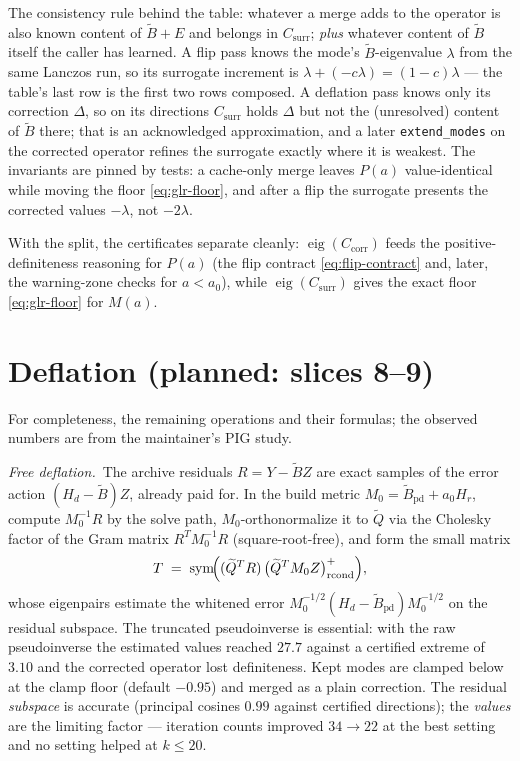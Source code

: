 \documentclass[11pt]{article}
\newcommand{\Bt}{\widetilde{B}}
\newcommand{\Hd}{H_d}
\newcommand{\Hr}{H_r}
\newcommand{\Ccorr}{C_{\mathrm{corr}}}
\newcommand{\Csurr}{C_{\mathrm{surr}}}
\begin{document}
\noindent
The consistency rule behind the table: whatever a merge adds to the
operator is also known content of $\Bt + E$ and belongs in $\Csurr$;
\emph{plus} whatever content of $\Bt$ itself the caller has learned. A
flip pass knows the mode's $\Bt$-eigenvalue $\lambda$ from the same
Lanczos run, so its surrogate increment is
$\lambda + (-c\lambda) = (1-c)\lambda$ --- the table's last row is the
first two rows composed. A deflation pass knows only its correction
$\Delta$, so on its directions $\Csurr$ holds $\Delta$ but not the
(unresolved) content of $\Bt$ there; that is an acknowledged
approximation, and a later \texttt{extend\_modes} on the corrected
operator refines the surrogate exactly where it is weakest. The
invariants are pinned by tests: a cache-only merge leaves $P(a)$
value-identical while moving the floor \eqref{eq:glr-floor}, and after a
flip the surrogate presents the corrected values $-\lambda$, not
$-2\lambda$.

With the split, the certificates separate cleanly:
$\operatorname{eig}(\Ccorr)$ feeds the positive-definiteness reasoning
for $P(a)$ (the flip contract \eqref{eq:flip-contract} and, later, the
warning-zone checks for $a < a_0$), while $\operatorname{eig}(\Csurr)$
gives the exact floor \eqref{eq:glr-floor} for $M(a)$.

\section{Deflation (planned: slices 8--9)}
\label{sec:deflation}

For completeness, the remaining operations and their formulas; the
observed numbers are from the maintainer's PIG study.

\medskip
\noindent
\emph{Free deflation.}\ The archive residuals $R = Y - \Bt Z$ are exact
samples of the error action $(\Hd - \Bt) Z$, already paid for. In the
build metric $M_0 = \Bt_{\mathrm{pd}} + a_0 \Hr$, compute $M_0^{-1} R$ by
the solve path, $M_0$-orthonormalize it to $\widetilde{Q}$ via the
Cholesky factor of the Gram matrix $R^T M_0^{-1} R$ (square-root-free),
and form the small matrix
\begin{equation}
  T \;=\; \operatorname{sym}\!\Bigl(
      (\widetilde{Q}^T R)\,
      \bigl(\widetilde{Q}^T M_0 Z\bigr)^{+}_{\mathrm{rcond}}
      \Bigr),
  \label{eq:free-deflation}
\end{equation}
whose eigenpairs estimate the whitened error
$M_0^{-1/2}(\Hd - \Bt_{\mathrm{pd}})M_0^{-1/2}$ on the residual subspace.
The truncated pseudoinverse is essential: with the raw pseudoinverse the
estimated values reached $27.7$ against a certified extreme of $3.10$ and
the corrected operator lost definiteness. Kept modes are clamped below at
the clamp floor (default $-0.95$) and merged as a plain correction. The
residual \emph{subspace} is accurate (principal cosines $0.99$ against
certified directions); the \emph{values} are the limiting factor ---
iteration counts improved $34 \to 22$ at the best setting and no setting
helped at $k \le 20$.
\end{document}
